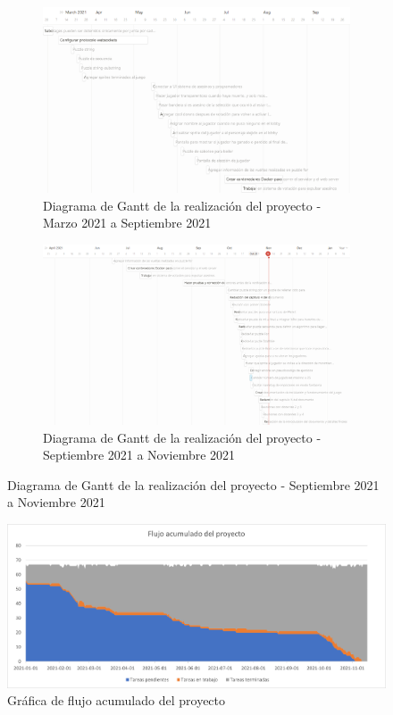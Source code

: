 \begin{figure}
    \ContinuedFloat
    \centering
    \caption{Diagrama de Gantt del proyecto}
    \label{fig:diagrama_gantt}
         \begin{subfigure}{\textwidth}
        \centering
        \includegraphics[width=0.8\linewidth]{images/mar-sep-21.png}
        \caption{Diagrama de Gantt de la realización del proyecto - Marzo 2021 a Septiembre 2021}
        \label{fig:gantt_proyecto_2}
    \end{subfigure}
    \begin{subfigure}{\textwidth}\ContinuedFloat
        \centering
        \includegraphics[width=0.8\linewidth]{images/sep-nov-21.png}
        \caption{Diagrama de Gantt de la realización del proyecto - Septiembre 2021 a Noviembre 2021}
        \label{fig:gantt_proyecto_3}
     \end{subfigure}
\end{figure}
\begin{figure}[H]
    \centering
    \includegraphics[width=0.8\linewidth]{images/BurndownChart.png}
    \caption{Gráfica de flujo acumulado del proyecto}
    \label{fig:grafica_flujo_acumulado}
\end{figure}

